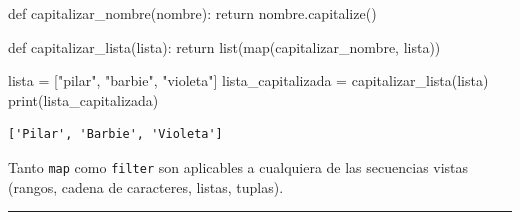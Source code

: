 \documentclass[
  letterpaper,
  DIV=11,
  numbers=noendperiod]{scrreprt}
\newenvironment{Shaded}{\begin{snugshade}}{\end{snugshade}}
\newcommand{\BuiltInTok}[1]{\textcolor[rgb]{0.00,0.23,0.31}{#1}}
\newcommand{\ControlFlowTok}[1]{\textcolor[rgb]{0.00,0.23,0.31}{#1}}
\newcommand{\KeywordTok}[1]{\textcolor[rgb]{0.00,0.23,0.31}{#1}}
\newcommand{\NormalTok}[1]{\textcolor[rgb]{0.00,0.23,0.31}{#1}}
\newcommand{\OperatorTok}[1]{\textcolor[rgb]{0.37,0.37,0.37}{#1}}
\newcommand{\StringTok}[1]{\textcolor[rgb]{0.13,0.47,0.30}{#1}}
\begin{document}
\begin{Shaded}
\begin{Highlighting}[]
\KeywordTok{def}\NormalTok{ capitalizar\_nombre(nombre):}
  \ControlFlowTok{return}\NormalTok{ nombre.capitalize()}

\KeywordTok{def}\NormalTok{ capitalizar\_lista(lista):}
  \ControlFlowTok{return} \BuiltInTok{list}\NormalTok{(}\BuiltInTok{map}\NormalTok{(capitalizar\_nombre, lista))}

\NormalTok{lista }\OperatorTok{=}\NormalTok{ [}\StringTok{"pilar"}\NormalTok{, }\StringTok{"barbie"}\NormalTok{, }\StringTok{"violeta"}\NormalTok{]}
\NormalTok{lista\_capitalizada }\OperatorTok{=}\NormalTok{ capitalizar\_lista(lista)}
\BuiltInTok{print}\NormalTok{(lista\_capitalizada)}
\end{Highlighting}
\end{Shaded}

\begin{verbatim}
['Pilar', 'Barbie', 'Violeta']
\end{verbatim}

\begin{tcolorbox}[enhanced jigsaw, colframe=quarto-callout-note-color-frame, opacityback=0, opacitybacktitle=0.6, bottomrule=.15mm, toprule=.15mm, coltitle=black, breakable, colback=white, leftrule=.75mm, titlerule=0mm, bottomtitle=1mm, toptitle=1mm, rightrule=.15mm, title=\textcolor{quarto-callout-note-color}{\faInfo}\hspace{0.5em}{Note}, arc=.35mm, left=2mm, colbacktitle=quarto-callout-note-color!10!white]

Tanto \texttt{map} como \texttt{filter} son aplicables a cualquiera de
las secuencias vistas (rangos, cadena de caracteres, listas, tuplas).

\end{tcolorbox}

\hfill\break

\begin{center}\rule{0.5\linewidth}{0.5pt}\end{center}

\hfill\break
\end{document}
